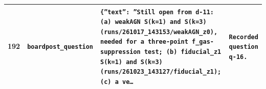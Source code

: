 \documentclass[11pt,a4paper]{article}
\begin{document}
\begin{longtable}{@{}p{}p{}p{}p{}@{}}
192 & \texttt{board}\newline\texttt{post\_\allowbreak{}question} & \texttt{\{''text'':\allowbreak{} ''Still open from d-11:\allowbreak{} (a)\allowbreak{} weakAGN S(k=\allowbreak{}1)\allowbreak{} and S(k=\allowbreak{}3)\allowbreak{} (runs/\allowbreak{}261017\_\allowbreak{}143153/\allowbreak{}weakAGN\_\allowbreak{}z0)\allowbreak{},\allowbreak{} needed for a three-point f\_\allowbreak{}gas-suppression test;\allowbreak{} (b)\allowbreak{} fiducial\_\allowbreak{}z1 S(k=\allowbreak{}1)\allowbreak{} and S(k=\allowbreak{}3)\allowbreak{} (runs/\allowbreak{}261023\_\allowbreak{}143127/\allowbreak{}fiducial\_\allowbreak{}z1)\allowbreak{};\allowbreak{} (c)\allowbreak{} a ve\ldots{}\allowbreak{}} & \texttt{Recorded question q-16.} \\
\bottomrule\end{longtable}
\end{document}
